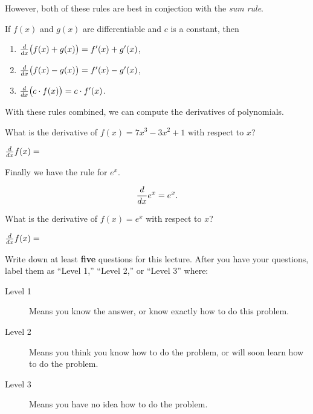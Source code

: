 \documentclass{ximera}
\begin{document}
However, both of these rules are best in conjection with the \textit{sum rule}.

\begin{theorem}
If $f(x)$ and $g(x)$ are differentiable and $c$ is a constant, then 
\begin{enumerate}
\item $\frac{d}{dx} \big( f(x) + g(x)\big) = f'(x) + g'(x)$,
\item $\frac{d}{dx} \big( f(x) - g(x)\big) = f'(x) - g'(x)$,
\item $\frac{d}{dx} \big(c\cdot f(x)\big) = c\cdot f'(x)$.
\end{enumerate}
\end{theorem}

With these rules combined, we can compute the derivatives of polynomials.


\begin{question}
  What is the derivative of $f(x) = 7x^3-3x^2+1$ with respect to $x$?
\begin{prompt}
$\frac{d}{dx} f(x) = $
\end{prompt}
\end{question}

Finally we have the rule for $e^x$.

\begin{theorem}
\[
\frac{d}{dx} e^x = e^x.
\]
\end{theorem}

\begin{question}
  What is the derivative of $f(x) = e^x$ with respect to $x$?
\begin{prompt}
$\frac{d}{dx} f(x) = $
\end{prompt}
\end{question}

\begin{question}
Write down at least \textbf{five} questions for this lecture. After
you have your questions, label them as ``Level 1,'' ``Level 2,'' or ``Level 3'' where:
\begin{description}
\item[Level 1] Means you know the answer, or know exactly how to do this problem.
\item[Level 2] Means you think you know how to do the problem, or will soon learn how to do the problem.
\item[Level 3] Means you have no idea how to do the problem. 
\end{description}
  \begin{freeResponse}
  \end{freeResponse}
\end{question}
\end{document}
